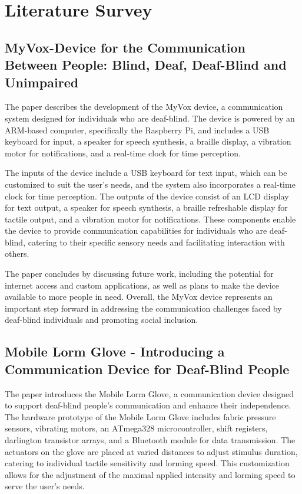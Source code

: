 \documentclass[12pt,a4paper]{report}
\begin{document}

\chapter{Literature Survey}
\section{MyVox-Device for the Communication Between People: Blind, Deaf, Deaf-Blind and Unimpaired}

The paper\cite{ref1} describes the development of the MyVox device, a communication system designed for individuals who are deaf-blind. The device is powered by an ARM-based computer, specifically the Raspberry Pi, and includes a USB keyboard for input, a speaker for speech synthesis, a braille display, a vibration motor for notifications, and a real-time clock for time perception.

 The inputs of the device include a USB keyboard for text input, which can be customized to suit the user's needs, and the system also incorporates a real-time clock for time perception. The outputs of the device consist of an LCD display for text output, a speaker for speech synthesis, a braille refreshable display for tactile output, and a vibration motor for notifications. These components enable the device to provide communication capabilities for individuals who are deaf-blind, catering to their specific sensory needs and facilitating interaction with others.

The paper concludes by discussing future work, including the potential for internet access and custom applications, as well as plans to make the device available to more people in need. Overall, the MyVox device represents an important step forward in addressing the communication challenges faced by deaf-blind individuals and promoting social inclusion.

\section{Mobile Lorm Glove - Introducing a Communication Device for Deaf-Blind People }
The paper\cite{ref2} introduces the Mobile Lorm Glove, a communication device designed to support deaf-blind people's communication and enhance their independence.
The hardware prototype of the Mobile Lorm Glove includes fabric pressure sensors, vibrating motors, an ATmega328 microcontroller, shift registers, darlington transistor arrays, and a Bluetooth module for data transmission. The actuators on the glove are placed at varied distances to adjust stimulus duration, catering to individual tactile sensitivity and lorming speed. This customization allows for the adjustment of the maximal applied intensity and lorming speed to serve the user's needs.
\end{document}
